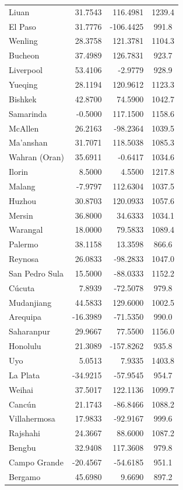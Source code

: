 \begin{longtable}{lrrc}
Liuan & 31.7543 & 116.4981 & 1239.4 \\
El Paso & 31.7776 & -106.4425 & 991.8 \\
Wenling & 28.3758 & 121.3781 & 1104.3 \\
Bucheon & 37.4989 & 126.7831 & 923.7 \\
Liverpool & 53.4106 & -2.9779 & 928.9 \\
Yueqing & 28.1194 & 120.9612 & 1123.3 \\
Bishkek & 42.8700 & 74.5900 & 1042.7 \\
Samarinda & -0.5000 & 117.1500 & 1158.6 \\
McAllen & 26.2163 & -98.2364 & 1039.5 \\
Ma'anshan & 31.7071 & 118.5038 & 1085.3 \\
Wahran (Oran) & 35.6911 & -0.6417 & 1034.6 \\
Ilorin & 8.5000 & 4.5500 & 1217.8 \\
Malang & -7.9797 & 112.6304 & 1037.5 \\
Huzhou & 30.8703 & 120.0933 & 1057.6 \\
Mersin & 36.8000 & 34.6333 & 1034.1 \\
Warangal & 18.0000 & 79.5833 & 1089.4 \\
Palermo & 38.1158 & 13.3598 & 866.6 \\
Reynosa & 26.0833 & -98.2833 & 1047.0 \\
San Pedro Sula & 15.5000 & -88.0333 & 1152.2 \\
Cúcuta & 7.8939 & -72.5078 & 979.8 \\
Mudanjiang & 44.5833 & 129.6000 & 1002.5 \\
Arequipa & -16.3989 & -71.5350 & 990.0 \\
Saharanpur & 29.9667 & 77.5500 & 1156.0 \\
Honolulu & 21.3089 & -157.8262 & 935.8 \\
Uyo & 5.0513 & 7.9335 & 1403.8 \\
La Plata & -34.9215 & -57.9545 & 954.7 \\
Weihai & 37.5017 & 122.1136 & 1099.7 \\
Cancún & 21.1743 & -86.8466 & 1088.2 \\
Villahermosa & 17.9833 & -92.9167 & 999.6 \\
Rajshahi & 24.3667 & 88.6000 & 1087.2 \\
Bengbu & 32.9408 & 117.3608 & 979.8 \\
Campo Grande & -20.4567 & -54.6185 & 951.1 \\
Bergamo & 45.6980 & 9.6690 & 897.2 \\

\end{longtable}

